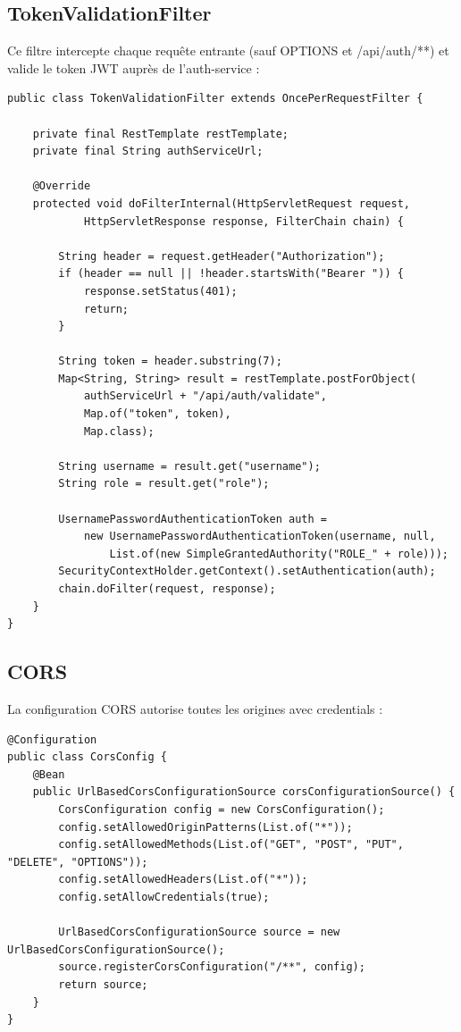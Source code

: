 \documentclass[12pt,a4paper,twoside]{report}
\begin{document}
\subsection{TokenValidationFilter}
Ce filtre intercepte chaque requête entrante (sauf OPTIONS et /api/auth/**) et valide le token JWT auprès de l'auth-service :

\begin{lstlisting}[style=javaStyle, caption=TokenValidationFilter]
public class TokenValidationFilter extends OncePerRequestFilter {

    private final RestTemplate restTemplate;
    private final String authServiceUrl;

    @Override
    protected void doFilterInternal(HttpServletRequest request,
            HttpServletResponse response, FilterChain chain) {
        
        String header = request.getHeader("Authorization");
        if (header == null || !header.startsWith("Bearer ")) {
            response.setStatus(401);
            return;
        }
        
        String token = header.substring(7);
        Map<String, String> result = restTemplate.postForObject(
            authServiceUrl + "/api/auth/validate",
            Map.of("token", token),
            Map.class);
        
        String username = result.get("username");
        String role = result.get("role");
        
        UsernamePasswordAuthenticationToken auth = 
            new UsernamePasswordAuthenticationToken(username, null,
                List.of(new SimpleGrantedAuthority("ROLE_" + role)));
        SecurityContextHolder.getContext().setAuthentication(auth);
        chain.doFilter(request, response);
    }
}
\end{lstlisting}

\subsection{CORS}
La configuration CORS autorise toutes les origines avec credentials :

\begin{lstlisting}[style=javaStyle, caption=CorsConfig]
@Configuration
public class CorsConfig {
    @Bean
    public UrlBasedCorsConfigurationSource corsConfigurationSource() {
        CorsConfiguration config = new CorsConfiguration();
        config.setAllowedOriginPatterns(List.of("*"));
        config.setAllowedMethods(List.of("GET", "POST", "PUT", "DELETE", "OPTIONS"));
        config.setAllowedHeaders(List.of("*"));
        config.setAllowCredentials(true);
        
        UrlBasedCorsConfigurationSource source = new UrlBasedCorsConfigurationSource();
        source.registerCorsConfiguration("/**", config);
        return source;
    }
}
\end{lstlisting}
\end{document}
